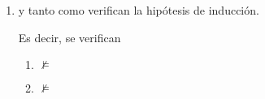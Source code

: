 \begin{isabellebody}
\begin{isamarkuptext}
\begin{demostracion}
\begin{enumerate}
Por otra parte, 
$$\begin{array}{lrl}
 & \isa{{\isasymnot}\ F\ {\isasymin}\ S} & \\
\isa{{\isasymLongrightarrow}} & \isa{{\isasymnot}\ {\isacharparenleft}G\ {\isasymand}\ H{\isacharparenright}\ {\isasymin}\ S} & \\
\isa{{\isasymLongrightarrow}} & \isa{{\isasymnot}\ G\ {\isasymin}\ S\ {\isasymor}\ {\isasymnot}\ H\ {\isasymin}\ S} & \isa{{\isacharparenleft}S\ es\ conjunto\ de\ Hintikka{\isacharparenright}}\\
\isa{{\isasymLongrightarrow}} & \isa{{\isasymI}\isactrlsub S} \not\models \isa{G\ {\isasymor}\ {\isasymI}\isactrlsub S} \not\models \isa{H} & \isa{{\isacharparenleft}HI{\isadigit{1}}\ y\ HI{\isadigit{2}}{\isacharparenright}}\\
\isa{{\isasymLongrightarrow}} & \isa{{\isasymnot}\ {\isacharparenleft}{\isasymI}\isactrlsub S\ {\isasymTurnstile}\ G\ {\isasymand}\ {\isasymI}\isactrlsub S\ {\isasymTurnstile}\ H{\isacharparenright}} & \\
\isa{{\isasymLongrightarrow}} & \isa{{\isasymI}\isactrlsub S{\isacharparenleft}G{\isacharparenright}\ {\isasymand}\ {\isasymI}\isactrlsub S{\isacharparenleft}H{\isacharparenright}} \isa{{\isacharequal}\ False} & \\
\isa{{\isasymLongrightarrow}} & \isa{{\isasymI}\isactrlsub S{\isacharparenleft}G\ {\isasymand}\ H{\isacharparenright}} \isa{{\isacharequal}\ False} & \\
\isa{{\isasymLongrightarrow}} & \isa{{\isasymI}\isactrlsub S{\isacharparenleft}F{\isacharparenright}}  \isa{{\isacharequal}\ False}& \\ 
\isa{{\isasymLongrightarrow}} & \isa{{\isasymI}\isactrlsub S} \not\models \isa{F} & 
      \end{array}$$ 

  \item[Caso 5:]  y tanto  como  verifican la hipótesis 
  de inducción. 

  Es decir, se verifican 
   \begin{enumerate}
      \item [HI1:]    
          $\not\models$ 
      \item [HI2:]    
          $\not\models$ 
   \end{enumerate}
 

\end{enumerate}
\end{demostracion}
\end{isamarkuptext}
\end{isabellebody}

